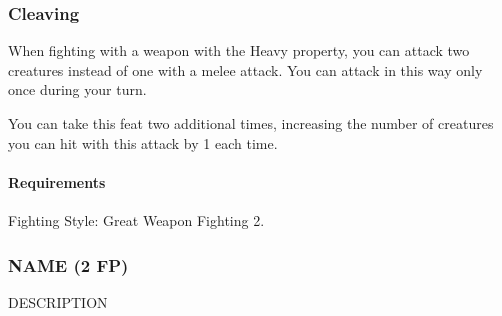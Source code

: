 \subsubsection{Cleaving} \label{feat::cleaving}
    When fighting with a weapon with the Heavy property, you can attack two creatures instead of one with a melee attack.
    You can attack in this way only once during your turn.

    You can take this feat two additional times, increasing the number of creatures you can hit with this attack by 1 each time.
    \paragraph{Requirements} Fighting Style: Great Weapon Fighting 2.
\subsubsection{NAME (2 FP)} \label{feat::name}
    DESCRIPTION

